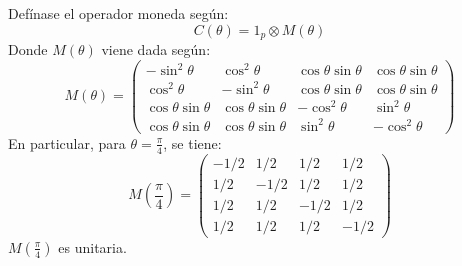 \documentclass[12pt]{article}
\begin{document}
Defínase el operador moneda según:
\begin{equation}
   C(\theta)= 1_p\otimes M(\theta)
\end{equation}
Donde $M(\theta)$ viene dada según:
\begin{equation*}
M(\theta) = 
\begin{pmatrix}
-\sin^2\theta & \cos^2\theta & \cos\theta\sin\theta & \cos\theta\sin\theta \\
\cos^2\theta & -\sin^2\theta & \cos\theta\sin\theta & \cos\theta\sin\theta \\
\cos\theta\sin\theta & \cos\theta\sin\theta & -\cos^2\theta & \sin^2\theta \\
\cos\theta\sin\theta & \cos\theta\sin\theta & \sin^2\theta & -\cos^2\theta
\end{pmatrix}
\end{equation*}
En particular, para $\theta=\frac{\pi}{4}$, se tiene:
\begin{equation*}
M(\frac{\pi}{4}) = 
\begin{pmatrix}
-1/2 & 1/2 & 1/2 & 1/2 \\
1/2 & -1/2 & 1/2 & 1/2 \\
1/2 & 1/2 & -1/2 & 1/2 \\
1/2 & 1/2 & 1/2 & -1/2
\end{pmatrix}
\end{equation*}
$M(\frac{\pi}{4})$ es unitaria.
\end{document}
